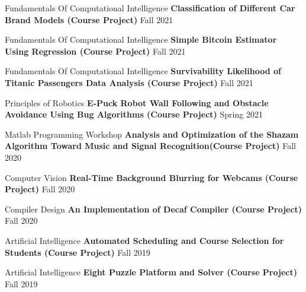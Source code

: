 \begin{cventries}
      \cventry
    {Fundamentals Of Computational Intelligence}
    {\textbf {Classification of Different Car Brand Models (Course Project)}}
    {}
    {Fall 2021}
    {}
    \vspace{0.35 cm}
	
	    \cventry
    {Fundamentals Of Computational Intelligence}
    {\textbf {Simple Bitcoin Estimator Using Regression (Course Project)}}
    {}
    {Fall 2021}
    {}
    \vspace{0.35 cm}

      \cventry
    {Fundamentals Of Computational Intelligence}
    {\textbf {Survivability Likelihood of Titanic Passengers Data Analysis (Course Project)}}
    {}
    {Fall 2021}
    {}
    \vspace{0.35 cm}
    
    \cventry
    {Principles of Robotics}
    {\textbf {E-Puck Robot Wall Following and Obstacle Avoidance Using Bug Algorithms (Course Project)}}
    {}
    {Spring 2021}
    {}
    \vspace{0.35 cm}
    
    \cventry
    {Matlab Programming Workshop}
    {\textbf {Analysis and Optimization of the Shazam Algorithm Toward Music and Signal Recognition(Course Project)}}
    {}
    {Fall 2020}
    {}
    \vspace{0.35 cm}
    
    \cventry
    {Computer Vision}
    {\textbf {Real-Time Background Blurring for Webcams (Course Project)}}
    {}
    {Fall 2020}
    {}
    \vspace{0.35 cm}

    \cventry
    {Compiler Design}
    {\textbf {An Implementation of Decaf Compiler (Course Project)}}
    {}
    {Fall 2020}
    {}
    \vspace{0.35 cm}

    \cventry
    {Artificial Intelligence}
    {\textbf {Automated Scheduling and Course Selection for Students (Course Project)}}
    {}
    {Fall 2019}
    {}
    \vspace{0.35 cm}

    \cventry
    {Artificial Intelligence}
    {\textbf {Eight Puzzle Platform and Solver (Course Project)}}
    {}
    {Fall 2019}
    {}
    
\end{cventries}